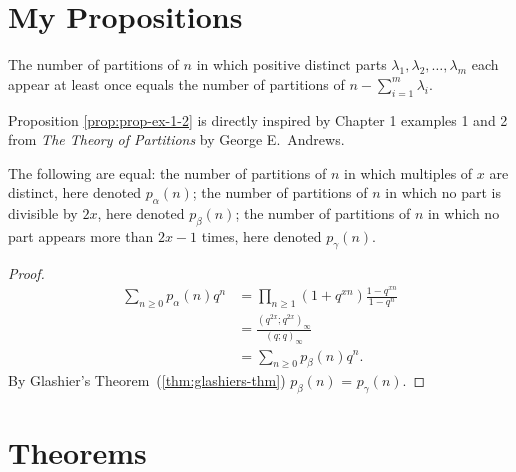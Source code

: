 

\maketitle

\tableofcontents
\clearpage{}


\section{My Propositions}\label{sec:my-propositions}

\begin{proposition}
    The number of partitions of $n$ in which positive distinct parts $\lambda_1, \lambda_2,\dots,\lambda_m$ each appear
    at least once equals
    the number of partitions of $n-\sum_{i=1}^{m}\lambda_i$.
\end{proposition}

Proposition \autoref{prop:prop-ex-1-2} is directly inspired by Chapter 1 examples 1 and 2
from \emph{The Theory of Partitions} by George E. Andrews.

\begin{proposition}\label{prop:prop-ex-1-2}
    The following are equal:
    the number of partitions of $n$ in which multiples of $x$ are distinct,
    here denoted $p_\alpha(n)$;
    the number of partitions of $n$ in which no part is divisible by $2x$,
    here denoted $p_\beta(n)$;
    the number of partitions of $n$ in which no part appears more than $2x-1$ times,
    here denoted $p_\gamma(n)$.
\end{proposition}
\begin{proof}
    \begin{align*}
        \sum_{n\ge 0}p_\alpha(n)q^n &= \prod_{n\ge 1}\left(1+q^{xn}\right)\frac{1-q^{xn}}{1-q^n}\\[0.5em]
        &= \frac{(q^{2x};q^{2x})_\infty}{(q;q)_\infty}\\[0.5em]
        &= \sum_{n\ge 0}p_\beta(n)q^n.
    \end{align*}
    By Glashier's Theorem~(\autoref{thm:glashiers-thm})
    $p_\beta(n)$ = $p_\gamma(n)$.
\end{proof}

\clearpage


\section{Theorems}\label{sec:theorems}

